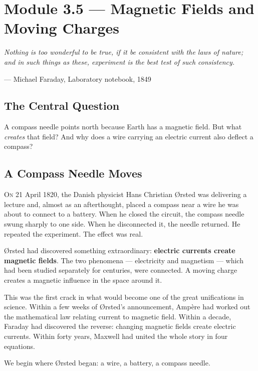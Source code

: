 \documentclass[12pt, a4paper, twoside]{book}
\theoremstyle{disc}
\begin{document}
\section{Module 3.5 — Magnetic Fields and Moving Charges}
\label{sec:magnetic_fields}

\epigraph{\itshape
  Nothing is too wonderful to be true, if it be consistent with the
  laws of nature; and in such things as these, experiment is the best
  test of such consistency.
}{--- Michael Faraday, Laboratory notebook, 1849}

\subsection{The Central Question}

\begin{puzzlebox}
A compass needle points north because Earth has a magnetic field. But what \emph{creates} that field? And why does a wire carrying an electric current also deflect a compass?
\end{puzzlebox}

\subsection{A Compass Needle Moves}

\lettrine[lines=3,loversize=0.08]{\textcolor{accent}{O}}{n} 21 April 1820, the Danish physicist Hans Christian \O{}rsted was delivering a lecture and, almost as an afterthought, placed a compass near a wire he was about to connect to a battery. When he closed the circuit, the compass needle swung sharply to one side. When he disconnected it, the needle returned. He repeated the experiment. The effect was real.

\O{}rsted had discovered something extraordinary: \textbf{electric currents create magnetic fields}. The two phenomena --- electricity and magnetism --- which had been studied separately for centuries, were connected. A moving charge creates a magnetic influence in the space around it.

This was the first crack in what would become one of the great unifications in science. Within a few weeks of \O{}rsted's announcement, Amp\`ere had worked out the mathematical law relating current to magnetic field. Within a decade, Faraday had discovered the reverse: changing magnetic fields create electric currents. Within forty years, Maxwell had united the whole story in four equations.

We begin where \O{}rsted began: a wire, a battery, a compass needle.
\end{document}

